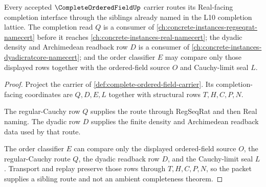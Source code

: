 \begin{theorem}
\label{thm:complete-ordered-field-sibling-route}
Every accepted $\CompleteOrderedFieldUp$ carrier routes its Real-facing completion interface through the siblings already named in the L10 completion lattice. The completion read $Q$ is a consumer of \autoref{ch:concrete-instances-regseqrat-namecert} before it reaches \autoref{ch:concrete-instances-real-namecert}; the dyadic density and Archimedean readback row $D$ is a consumer of \autoref{ch:concrete-instances-dyadicratcore-namecert}; and the order classifier $E$ may compare only those displayed rows together with the ordered-field source $O$ and Cauchy-limit seal $L$.
\end{theorem}
\begin{proof}
Project the carrier of \autoref{def:complete-ordered-field-carrier}. Its completion-facing coordinates are $Q,D,E,L$ together with structural rows $T,H,C,P,N$.

The regular-Cauchy row $Q$ supplies the route through RegSeqRat and then Real naming. The dyadic row $D$ supplies the finite density and Archimedean readback data used by that route.

The order classifier $E$ can compare only the displayed ordered-field source $O$, the regular-Cauchy route $Q$, the dyadic readback row $D$, and the Cauchy-limit seal $L$. Transport and replay preserve those rows through $T,H,C,P,N$, so the packet supplies a sibling route and not an ambient completeness theorem.
\end{proof}

\begin{closurestatus}{\CompleteOrderedFieldUp}
  \theoryclosure{\seedClosure}
  \formalstatus{\theoremCheckedV}
\end{closurestatus}
